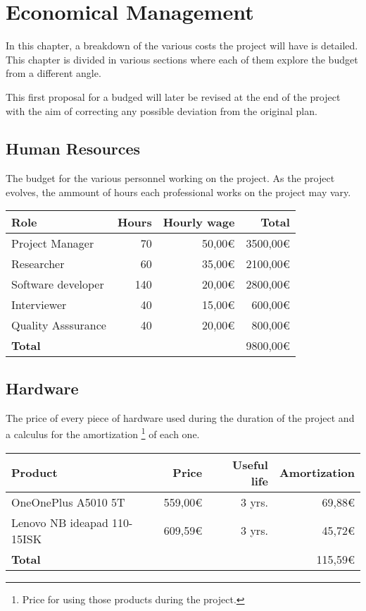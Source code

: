 \chapter{Economical Management}\label{economical}

In this chapter, a breakdown of the various costs the project will have is detailed. This chapter is divided in various sections where each of them explore the budget from a different angle.

This first proposal for a budged will later be revised at the end of the project with the aim of correcting any possible deviation from the original plan.

\section{Human Resources}

The budget for the various personnel working on the project. As the project evolves, the ammount of hours each professional works on the project may vary.

\begin{center}
    \begin{tabular}{ | l | r | r | r | }
        \hline
        \textbf{Role} & \textbf{Hours} & \textbf{Hourly wage} & \textbf{Total} \\ 
        \hline
        \hline
        Project Manager & 70 & 50,00€ & 3500,00€ \\  
        Researcher & 60 & 35,00€ & 2100,00€ \\
        Software developer & 140 & 20,00€ & 2800,00€ \\
        Interviewer & 40 & 15,00€ & 600,00€ \\
        Quality Asssurance & 40 & 20,00€ & 800,00€ \\
        \hline
        \textbf{Total} &  &  & 9800,00€ \\      
        \hline
    \end{tabular}
\end{center}

\section{Hardware}

The price of every piece of hardware used during the duration of the project and a calculus for the amortization
\footnote{Price for using those products during the project.}
of each one.

\begin{center}
    \begin{tabular}{ | l | r | r | r | }
        \hline
        \textbf{Product} & \textbf{Price} &
        \textbf{Useful life} & \textbf{Amortization} \\ 
        \hline
        \hline
        OneOnePlus A5010 5T & 559,00€ & 3 yrs. & 69,88€ \\  
        Lenovo NB ideapad 110-15ISK & 609,59€ & 3 yrs. & 45,72€ \\ 
        \hline
        \textbf{Total} & & & 115,59€ \\      
        \hline
    \end{tabular}
\end{center}

